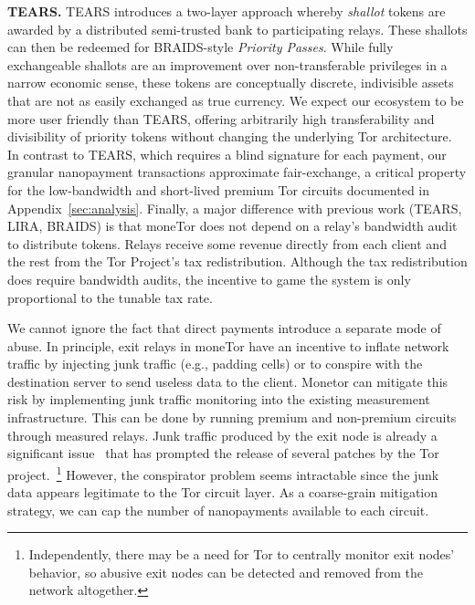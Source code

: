 \medskip\noindent\textbf{TEARS.}
TEARS introduces a two-layer approach whereby \emph{shallot} tokens are awarded by a distributed semi-trusted bank to participating relays.
These shallots can then be redeemed for BRAIDS-style \emph{Priority Passes}.
While fully exchangeable shallots are an improvement over non-transferable privileges in a narrow economic sense, these tokens are conceptually discrete, indivisible assets that are not as easily exchanged as true currency.
We expect our ecosystem to be more user friendly than TEARS, offering arbitrarily high transferability and divisibility of priority tokens without changing the underlying Tor architecture.
In contrast to TEARS, which requires a blind signature for each payment, our granular nanopayment transactions approximate fair-exchange, a critical property for the low-bandwidth and short-lived premium Tor circuits documented in Appendix~\ref{sec:analysis}.
Finally, a major difference with previous work (TEARS, LIRA, BRAIDS) is that moneTor does not depend on a relay's bandwidth audit to distribute tokens.
Relays receive some revenue directly from each client and the rest from the Tor Project's tax redistribution.
Although the tax redistribution does require bandwidth audits, the incentive to game the system is only proportional to the tunable tax rate.

We cannot ignore the fact that direct payments introduce a separate mode of abuse.
In principle, exit relays in moneTor have an incentive to inflate network traffic by injecting junk traffic (e.g., padding cells) or to conspire with the destination server to send useless data to the client.
Monetor can mitigate this risk by implementing junk traffic monitoring into the existing measurement infrastructure.
This can be done by running premium and non-premium circuits through measured relays.
Junk traffic produced by the exit node is already a significant issue~\cite{rochet2018dropping} that has prompted the release of several patches by the Tor project.~\footnote{Independently, there may be a need for Tor to centrally monitor exit nodes' behavior, so abusive exit nodes can be detected and removed from the network altogether.}
However, the conspirator problem seems intractable since the junk data appears legitimate to the Tor circuit layer.
As a coarse-grain mitigation strategy, we can cap the number of nanopayments available to each circuit.
